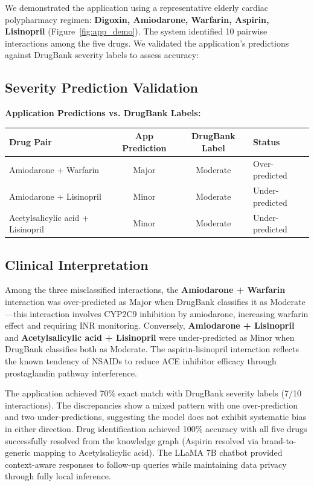 \documentclass[11pt,a4paper]{article}
\begin{document}
We demonstrated the application using a representative elderly cardiac polypharmacy regimen: \textbf{Digoxin, Amiodarone, Warfarin, Aspirin, Lisinopril} (Figure~\ref{fig:app_demo}). The system identified 10 pairwise interactions among the five drugs. We validated the application's predictions against DrugBank severity labels to assess accuracy:

\subsection{Severity Prediction Validation}

\textbf{Application Predictions vs. DrugBank Labels:}

\begin{table}[H]
\centering
\small
\begin{tabular}{lccl}
\hline
\textbf{Drug Pair} & \textbf{App Prediction} & \textbf{DrugBank Label} & \textbf{Status} \\
\hline
Amiodarone + Warfarin & Major & Moderate & Over-predicted \\
Amiodarone + Lisinopril & Minor & Moderate & Under-predicted \\
Acetylsalicylic acid + Lisinopril & Minor & Moderate & Under-predicted \\
\hline
\end{tabular}
\end{table}

\subsection{Clinical Interpretation}

Among the three misclassified interactions, the \textbf{Amiodarone + Warfarin} interaction was over-predicted as Major when DrugBank classifies it as Moderate---this interaction involves CYP2C9 inhibition by amiodarone, increasing warfarin effect and requiring INR monitoring. Conversely, \textbf{Amiodarone + Lisinopril} and \textbf{Acetylsalicylic acid + Lisinopril} were under-predicted as Minor when DrugBank classifies both as Moderate. The aspirin-lisinopril interaction reflects the known tendency of NSAIDs to reduce ACE inhibitor efficacy through prostaglandin pathway interference.

The application achieved 70\% exact match with DrugBank severity labels (7/10 interactions). The discrepancies show a mixed pattern with one over-prediction and two under-predictions, suggesting the model does not exhibit systematic bias in either direction. Drug identification achieved 100\% accuracy with all five drugs successfully resolved from the knowledge graph (Aspirin resolved via brand-to-generic mapping to Acetylsalicylic acid). The LLaMA 7B chatbot provided context-aware responses to follow-up queries while maintaining data privacy through fully local inference.
\end{document}
